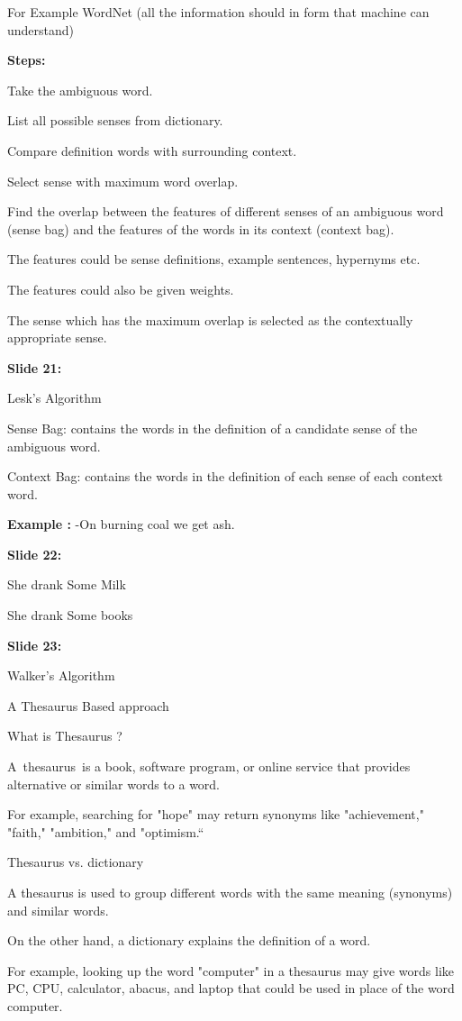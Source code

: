 \documentclass[11pt,a4paper]{article}
\begin{document}
For Example WordNet (all the information should in form that machine can understand)

\textbf{Steps:} 

Take the ambiguous word.

List all possible senses from dictionary.

Compare definition words with surrounding context.

Select sense with maximum word overlap.

Find the overlap between the features of different senses of an ambiguous word (sense bag) and the features of the words in its context (context bag).

The features could be sense definitions, example sentences, hypernyms etc.

The features could also be given weights.

The sense which has the maximum overlap is selected as the contextually appropriate sense.

\textbf{Slide 21:}

Lesk’s Algorithm

Sense Bag: contains the words in the definition of a candidate sense of the ambiguous word.

Context Bag: contains the words in the definition of each sense of each context word.

\textbf{Example :} -On burning coal we get ash.

\textbf{Slide 22:}

She drank Some Milk

She drank Some books

\textbf{Slide 23:}

Walker’s Algorithm

A Thesaurus Based approach

What is Thesaurus ?

A thesaurus is a book, software program, or online service that provides alternative or similar words to a word.

For example, searching for "hope" may return synonyms like "achievement," "faith," "ambition," and "optimism.“

Thesaurus vs. dictionary

A thesaurus is used to group different words with the same meaning (synonyms) and similar words.

On the other hand, a dictionary explains the definition of a word.

For example, looking up the word "computer" in a thesaurus may give words like PC, CPU, calculator, abacus, and laptop that could be used in place of the word computer.
\end{document}
